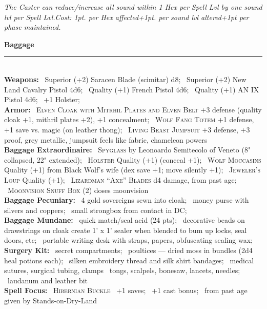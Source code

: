 \documentclass[11pt]{article}
\newcommand{\heading}[1]{{\sc\bfseries #1}}
\newcommand{\spell}[1]{{\sc\bfseries\large #1}}
\begin{document}
\noindent\textsl{The Caster can reduce/increase all sound within 1 Hex per Spell Lvl by
one sound lvl per Spell Lvl.Cost: 1pt. per Hex affected+1pt. per sound
lvl altered+1pt per phase maintained.}


\clearpage
\noindent
{\sc\bfseries\Large Baggage}
\vspace*{4pt}
\hrule
\mbox{ }
\\[4pt]
%
\heading{Weapons:}
\ Superior (+2) Saracen Blade (scimitar) d8;
\ Superior (+2) New Land Cavalry Pistol 4d6;
\ Quality (+1) French Pistol 4d6;
\ Quality (+1) AN IX Pistol 4d6;
\ +1 Holster;
%
\\[6pt]
%
\heading{Armor:}
\ \textsc{Elven Cloak with Mitrhil Plates and Elven Belt} +3 defense (quality cloak
+1, mithril plates +2), +1 concealment;
\ \textsc{Wolf Fang Totem} +1 defense, +1 save vs. magic (on leather thong);
\ \textsc{Living Beast Jumpsuit} +3 defense, +3 proof, grey metallic,
jumpsuit feels like fabric, chameleon powers
%
\\[6pt]
%
\heading{Baggage Extraordinaire:}
\ \textsc{Spyglass} by Leonoardo Semitecolo of Veneto (8" collapsed, 22" extended);
\ \textsc{Holster} Quality (+1) (conceal +1);
\ \textsc{Wolf Moccasins} Quality (+1) from Black Wolf's wife (dex
save +1; move silently +1);
\ \textsc{Jeweler's Loup} Quality (+1);
\ \textsc{Lizardman ``Axe'' Blades} d4 damage, from past age;
\ \textsc{Moonvision Snuff Box} (2) doses moonvision
%
\\[6pt]
%
\heading{Baggage Pecuniary:}
\ 4 gold sovereigns sewn into cloak;
\ money purse with silvers and coppers;
\ small strongbox from contact in DC;
%
\\[6pt]
%
\heading{Baggage Mundane:}
\ quick match/seal acid (24 pts);
\ decorative beads on drawstrings on cloak create 1' x 1' sealer when
blended to bum up locks, seal doors, etc;
\ portable writing desk with straps, papers, obfuscating sealing wax;
%
\\[6pt]
%
\heading{Surgery Kit:}
\ secret compartments;
\ poultices --- dried moss in bundles (2d4 heal potions each);
\ silken embroidery thread and silk shirt bandages;
\ medical sutures, surgical tubing, clamps
\ tongs, scalpels, bonesaw, lancets, needles;
\ laudanum and leather bit
%
\\[6pt]
%
\heading{Spell Focus:}
\ \textsc{Hibernian Buckle}
\ +1 saves;
\ +1 cast bonus;
\ from past age given by Stands-on-Dry-Land
%
\\[6pt]
\end{document}
